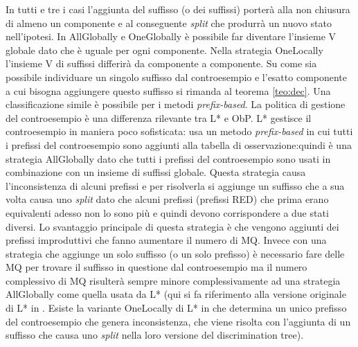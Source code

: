 In tutti e tre i casi l'aggiunta del suffisso (o dei suffissi) porterà alla non chiusura di almeno un componente e al conseguente \textit{split} che produrrà un nuovo stato nell'ipotesi.  In AllGlobally e OneGlobally è possibile far diventare l'insieme V globale dato che è uguale per ogni componente. Nella strategia OneLocally l'insieme V di suffissi differirà da componente a componente. Su come sia possibile individuare un singolo suffisso dal controesempio e l'esatto componente a cui bisogna aggiungere questo suffisso si rimanda al teorema \ref{teo:dec}.
Una classificazione simile è possibile per i metodi \textit{prefix-based}.
 La politica di gestione del controesempio è una differenza rilevante tra L* e \ac{ObP}. L* gestisce il controesempio in maniera poco sofisticata: usa un metodo \textit{prefix-based} in cui tutti i prefissi del controesempio sono aggiunti alla tabella di osservazione:quindi è una strategia AllGlobally dato che tutti i prefissi del controesempio sono usati in combinazione con un insieme di suffissi globale. Questa strategia causa l'inconsistenza di alcuni prefissi e per risolverla si aggiunge un suffisso che a sua volta causa uno \textit{split} dato che alcuni prefissi (prefissi RED) che prima erano equivalenti adesso non lo sono più e quindi devono corrispondere a due stati diversi. Lo svantaggio principale di questa strategia è che vengono aggiunti dei prefissi improduttivi che fanno aumentare il numero di \ac{MQ}. Invece con una strategia che aggiunge un solo suffisso (o un solo prefisso) è necessario fare delle \ac{MQ} per trovare il suffisso in questione dal controesempio ma il numero complessivo di \ac{MQ} risulterà sempre minore complessivamente ad una strategia AllGlobally come quella usata da L* (qui si fa riferimento alla versione originale di L* in \cite{Angluin87}. Esiste la variante OneLocally di L* in \cite{Kearns94} che determina un unico prefisso del controesempio  che genera inconsistenza, che viene risolta con l'aggiunta di un suffisso che causa uno \textit{split} nella loro versione del discrimination tree). 

